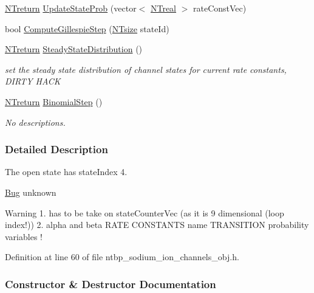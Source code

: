 \begin{DoxyCompactItemize}
\hyperlink{nt__types_8h_ab9564ee8f091e809d21b8451c6683c53}{NTreturn} \hyperlink{class_n_t_b_p__sodium__ion__channels__o_a9eb9ea77b08b7a09650dc7409fca112d}{UpdateStateProb} (vector$<$ \hyperlink{nt__types_8h_a814a97893e9deb1eedcc7604529ba80d}{NTreal} $>$ rateConstVec)
\item 
bool \hyperlink{class_n_t_b_p__sodium__ion__channels__o_af3fd0046325755ffc770b38da3748a8b}{ComputeGillespieStep} (\hyperlink{nt__types_8h_a06c124f2e4469769b58230253ce0560b}{NTsize} stateId)
\item 
\hyperlink{nt__types_8h_ab9564ee8f091e809d21b8451c6683c53}{NTreturn} \hyperlink{class_n_t_b_p__sodium__ion__channels__o_ad6cccdf139751f6f517ba20aa491e968}{SteadyStateDistribution} ()
\begin{DoxyCompactList}\small\item\em set the steady state distribution of channel states for current rate constants, DIRTY HACK \item\end{DoxyCompactList}\item 
\hyperlink{nt__types_8h_ab9564ee8f091e809d21b8451c6683c53}{NTreturn} \hyperlink{class_n_t_b_p__sodium__ion__channels__o_ad888125f6166e07a07c6dda135ff5bce}{BinomialStep} ()
\begin{DoxyCompactList}\small\item\em No descriptions. \item\end{DoxyCompactList}\end{DoxyCompactItemize}


\subsubsection{Detailed Description}
The open state has stateIndex 4. \begin{Desc}
\item[\hyperlink{bug__bug000081}{Bug}]unknown \end{Desc}
\begin{DoxyWarning}{Warning}
1.  has to be take on stateCounterVec (as it is 9 dimensional (loop index!)) 2. alpha and beta RATE CONSTANTS name TRANSITION probability variables ! 
\end{DoxyWarning}


Definition at line 60 of file ntbp\_\-sodium\_\-ion\_\-channels\_\-obj.h.



\subsubsection{Constructor \& Destructor Documentation}
